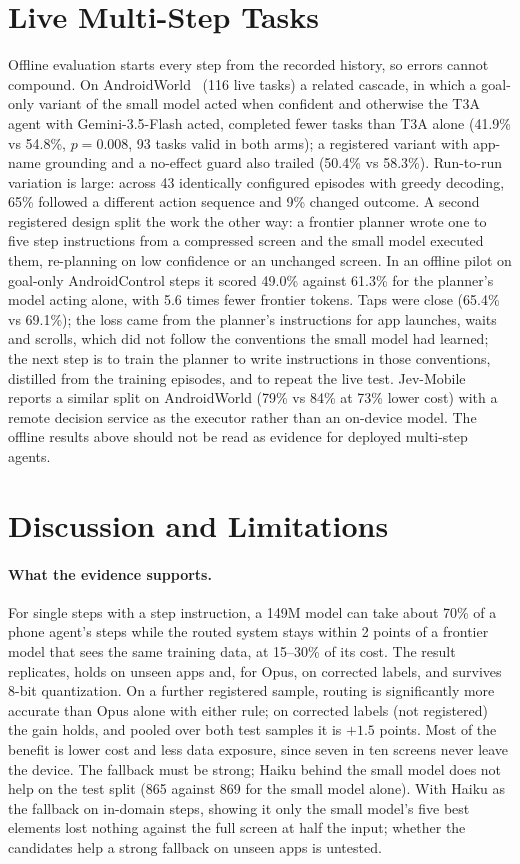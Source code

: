 \documentclass[10pt]{article}
\begin{document}
\section{Live Multi-Step Tasks}\label{sec:live}
Offline evaluation starts every step from the recorded history, so errors cannot compound. On AndroidWorld~\citep{androidworld} (116 live tasks) a related cascade, in which a goal-only variant of the small model acted when confident and otherwise the T3A agent with Gemini-3.5-Flash acted, completed fewer tasks than T3A alone (41.9\% vs 54.8\%, $p=0.008$, 93 tasks valid in both arms); a registered variant with app-name grounding and a no-effect guard also trailed (50.4\% vs 58.3\%). Run-to-run variation is large: across 43 identically configured episodes with greedy decoding, 65\% followed a different action sequence and 9\% changed outcome. A second registered design split the work the other way: a frontier planner wrote one to five step instructions from a compressed screen and the small model executed them, re-planning on low confidence or an unchanged screen. In an offline pilot on goal-only AndroidControl steps it scored 49.0\% against 61.3\% for the planner's model acting alone, with 5.6 times fewer frontier tokens. Taps were close (65.4\% vs 69.1\%); the loss came from the planner's instructions for app launches, waits and scrolls, which did not follow the conventions the small model had learned; the next step is to train the planner to write instructions in those conventions, distilled from the training episodes, and to repeat the live test. Jev-Mobile~\citep{jevmobile} reports a similar split on AndroidWorld (79\% vs 84\% at 73\% lower cost) with a remote decision service as the executor rather than an on-device model. The offline results above should not be read as evidence for deployed multi-step agents.

\section{Discussion and Limitations}
\paragraph{What the evidence supports.} For single steps with a step instruction, a 149M model can take about 70\% of a phone agent's steps while the routed system stays within 2 points of a frontier model that sees the same training data, at 15--30\% of its cost. The result replicates, holds on unseen apps and, for Opus, on corrected labels, and survives 8-bit quantization. On a further registered sample, routing is significantly more accurate than Opus alone with either rule; on corrected labels (not registered) the gain holds, and pooled over both test samples it is $+1.5$ points. Most of the benefit is lower cost and less data exposure, since seven in ten screens never leave the device. The fallback must be strong; Haiku behind the small model does not help on the test split (865 against 869 for the small model alone). With Haiku as the fallback on in-domain steps, showing it only the small model's five best elements lost nothing against the full screen at half the input; whether the candidates help a strong fallback on unseen apps is untested.
\end{document}
